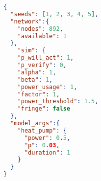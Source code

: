 \begin{lstlisting}[language=json,firstnumber=1, 
  caption={Configuration file for scenario 4
  },captionpos=b,label={scenario4config}]
{
  "seeds": [1, 2, 3, 4, 5],
  "network":{
    "nodes": 892,
    "available": 1
  },
    "sim": {
    "p_will_act": 1,
    "p_verify": 0,
    "alpha": 1,
    "beta": 1,
    "power_usage": 1,
    "factor": 1,
    "power_threshold": 1.5,
    "fringe": false
  },
  "model_args":{
    "heat_pump": {
      "power": 0.5,
      "p": 0.03,
      "duration": 1
    }
  }
}
\end{lstlisting}